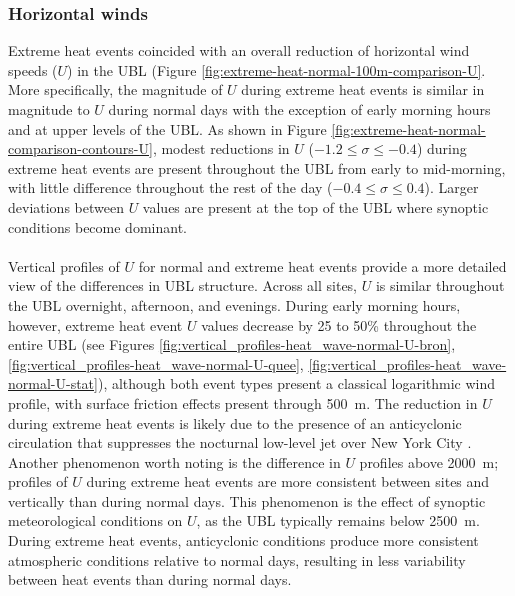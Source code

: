 \documentclass[11pt,a4paper]{article}
\begin{document}
\subsubsection{Horizontal winds}
Extreme heat events coincided with an overall reduction of horizontal wind speeds ($U$) in the UBL (Figure \ref{fig:extreme-heat-normal-100m-comparison-U}. More specifically, the magnitude of $U$ during extreme heat events is similar in magnitude to $U$ during normal days with the exception of early morning hours and at upper levels of the UBL. As shown in Figure \ref{fig:extreme-heat-normal-comparison-contours-U}, modest reductions in $U$ ($-1.2 \leq \sigma \leq -0.4$) during extreme heat events are present throughout the UBL from early to mid-morning, with little difference throughout the rest of the day ($-0.4 \leq \sigma \leq 0.4$). Larger deviations between $U$ values are present at the top of the UBL where synoptic conditions become dominant.
\\ \\
Vertical profiles of $U$ for normal and extreme heat events provide a more detailed view of the differences in UBL structure. Across all sites, $U$ is similar throughout the UBL overnight, afternoon, and evenings. During early morning hours, however, extreme heat event $U$ values decrease by 25 to 50\% throughout the entire UBL (see Figures \ref{fig:vertical_profiles-heat_wave-normal-U-bron}, \ref{fig:vertical_profiles-heat_wave-normal-U-quee}, \ref{fig:vertical_profiles-heat_wave-normal-U-stat}), although both event types present a classical logarithmic wind profile, with surface friction effects present through \SI{500}{\meter}. The reduction in $U$ during extreme heat events is likely due to the presence of an anticyclonic circulation that suppresses the nocturnal low-level jet over New York City \citep{chen1993}. Another phenomenon worth noting is the difference in $U$ profiles above \SI{2000}{\meter}; profiles of $U$ during extreme heat events are more consistent between sites and vertically than during normal days. This phenomenon is the effect of synoptic meteorological conditions on $U$, as the UBL typically remains below \SI{2500}{\meter}. During extreme heat events, anticyclonic conditions produce more consistent atmospheric conditions relative to normal days, resulting in less variability between heat events than during normal days.
\\ \\
\end{document}
